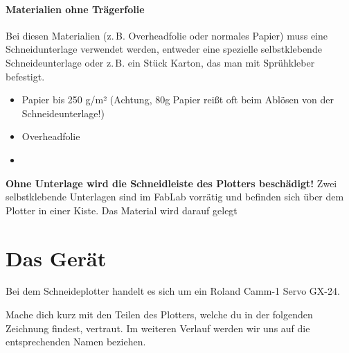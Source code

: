 \documentclass{\basedir/fablab-document}
\begin{document}
\paragraph{Materialien ohne Trägerfolie}


Bei diesen Materialien (z.\,B. Overheadfolie oder normales Papier) muss eine Schneidunterlage verwendet werden,
entweder eine spezielle selbstklebende Schneideunterlage oder z.\,B. ein Stück Karton, das man mit Sprühkleber befestigt.  
\begin{itemize}
 \item Papier bis 250 g/m²   (Achtung, 80g Papier reißt oft beim Ablösen von der Schneideunterlage!)
 \item Overheadfolie
 \item {}
\end{itemize}

\textbf{Ohne Unterlage wird die Schneidleiste des Plotters beschädigt!}
Zwei selbstklebende Unterlagen sind im FabLab vorrätig und befinden sich über dem Plotter in einer Kiste.
Das Material wird darauf gelegt 


\tableofcontents

\section{Das Gerät}
Bei dem Schneideplotter handelt es sich um ein Roland Camm-1 Servo GX-24. 

Mache dich kurz mit den Teilen des Plotters, welche du in der folgenden Zeichnung findest, vertraut.
Im weiteren Verlauf werden wir uns auf die entsprechenden Namen beziehen.
\end{document}
